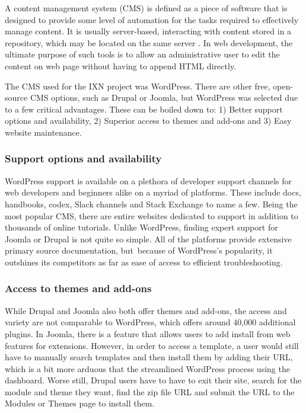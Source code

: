 \documentclass[fontsize=10pt]{extarticle}
\numberwithin{figure}{section} %
\begin{document}
A content management system (CMS) is defined as a piece of software that
is designed to provide some level of automation for the tasks required
to effectively manage content. It is usually server-based, interacting
with content stored in a repository, which may be located on the same
server \cite{p1} . In web development, the ultimate purpose of such
tools is to allow an administrative user to edit the content on web page
without having to append HTML directly.

The CMS used for the IXN project was WordPress. There are other free,
open-source CMS options, such as Drupal or Joomla, but WordPress was
selected due to a few critical advantages. These can be boiled down to:
1) Better support options and availability, 2) Superior access to themes
and add-ons and 3) Easy website maintenance.~

\hypertarget{support-options-and-availability}{%
\subsubsection{Support options and
availability~}\label{support-options-and-availability}}

WordPress support is available on a plethora of developer support
channels for web developers and beginners alike on a myriad of
platforms. These include docs, handbooks, codex, Slack channels and
Stack Exchange to name a few. Being the most popular CMS, there are
entire websites dedicated to support in addition to thousands of online
tutorials. Unlike WordPress, finding expert support for Joomla or Drupal
is not quite so simple. All of the platforms provide extensive primary
source documentation, but~because of WordPress's popularity, it
outshines its competitors as far as ease of access to efficient
troubleshooting.~

\hypertarget{access-to-themes-and-add-ons}{%
\subsubsection{Access to themes and
add-ons~}\label{access-to-themes-and-add-ons}}

While Drupal and Joomla also both offer themes and add-ons, the access
and variety are not comparable to WordPress, which offers around 40,000
additional plugins. In Joomla, there is a feature that allows users to
add install from web features for extensions. However, in order to
access a template, a user would still have to manually search templates
and then install them by adding their URL, which is a bit more arduous
that the streamlined WordPress process using the dashboard. Worse still,
Drupal users have to have to exit their site, search for the module and
theme they want, find the zip file URL and submit the URL to the Modules
or Themes page to install them.~
\end{document}
